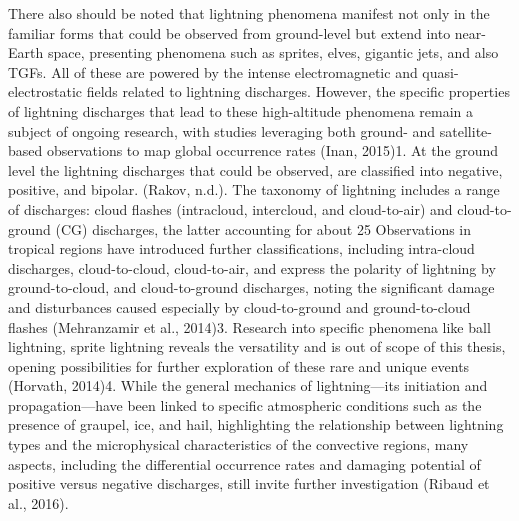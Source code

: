 There also should be noted that lightning phenomena manifest not only in the familiar forms that could be observed from ground-level but extend into near-Earth space, presenting phenomena such as sprites, elves, gigantic jets, and also TGFs. All of these are powered by the intense electromagnetic and quasi-electrostatic fields related to lightning discharges. However, the specific properties of lightning discharges that lead to these high-altitude phenomena remain a subject of ongoing research, with studies leveraging both ground- and satellite-based observations to map global occurrence rates (Inan, 2015)1.
At the ground level the lightning discharges that could be observed, are classified into negative, positive, and bipolar. (Rakov, n.d.). The taxonomy of lightning includes a range of discharges: cloud flashes (intracloud, intercloud, and cloud-to-air) and cloud-to-ground (CG) discharges, the latter accounting for about 25%
Observations in tropical regions have introduced further classifications, including intra-cloud discharges, cloud-to-cloud, cloud-to-air, and express the polarity of lightning by ground-to-cloud, and cloud-to-ground discharges, noting the significant damage and disturbances caused especially by cloud-to-ground and ground-to-cloud flashes (Mehranzamir et al., 2014)3.
Research into specific phenomena like ball lightning, sprite lightning reveals the versatility and is out of scope of this thesis, opening possibilities for further exploration of these rare and unique events (Horvath, 2014)4.
While the general mechanics of lightning—its initiation and propagation—have been linked to specific atmospheric conditions such as the presence of graupel, ice, and hail, highlighting the relationship between lightning types and the microphysical characteristics of the convective regions, many aspects, including the differential occurrence rates and damaging potential of positive versus negative discharges, still invite further investigation (Ribaud et al., 2016).


